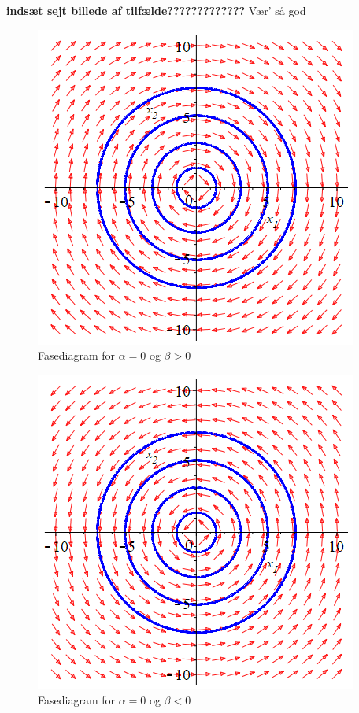 \begin{bev}
\begin{itemize}
    \textbf{indsæt sejt billede af tilfælde?????????????} Vær' så god
    
    \begin{minipage}{0.4\textwidth}
    \begin{figure}[H]
        \centering
        \captionsetup{justification=centering}
        \includegraphics[scale=0.4]{Billeder/spiral_alpha_eq_0_beta_geq_0.png}
        \caption{Fasediagram for $\alpha=0$ og $\beta>0$}
        \label{fig:fase_komplekse_egenværdier_alpha_eq_0_beta_geq_0}
    \end{figure}
    \end{minipage}
    \hfill
    \begin{minipage}{0.4\textwidth}
    \begin{figure}[H]
        \centering
        \captionsetup{justification=centering}
        \includegraphics[scale=0.4]{Billeder/spiral_alpha_eq_0_beta_leq_0.png}
        \caption{Fasediagram for $\alpha=0$ og $\beta<0$}
        \label{fig:fase_komplekse_egenværdier_alpha_eq_0_beta_leq_0}
    \end{figure}
    \end{minipage}
    

\end{itemize}
\end{bev}
